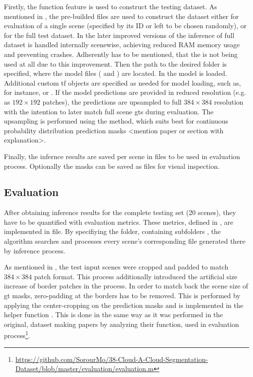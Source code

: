 {Firstly, the  function feature is used to construct the testing dataset.
As mentioned in ,
the pre-builded  files are used to construct the dataset either for evaluation of a single scene (specified by its ID or left to be chosen randomly),
or for the full test dataset. In the later improved versions of  the inference of full dataset is handled internally scenewise,
achieving reduced RAM memory usage and preventing crashes. Adherently has to be mentioned, that the  is not being used at all due to this improvement.
Then the path to the desired  folder is specified, where the model files ( and ) are located.
In  the  model is loaded. Additional custom \gls{tf} objects are specified as needed for model loading,
such as, for instance,  or .
If the model predictions are provided in reduced resolution (e.g. as \ensuremath{192\times192} patches),
the predictions are upsampled to full \ensuremath{384\times384} resolution with the intention to later match full scene \glspl{gt} during evaluation.
The upsampling is performed using the  method,
which suits best for continuous probability distribution prediction masks <mention paper or section with explanation>.

Finally, the infernce results are saved per scene in  files to be used in evaluation process.
Optionally the masks can be saved as  files for visual inspection.

\subsection*{Evaluation}

After obtaining inference results for the complete testing set (20 scenes), they have to be quantified with evaluation metrics.
These metrics, defined in , are implemented in  file.
By specifiying the  folder, containing subfolders ,
the algorithm searches and processes every scene's corresponding  file generated there by inference process.

As mentioned in , the test input scenes were cropped and padded to match \ensuremath{384\times384} patch format.
This process additionally introduced the artificial size increase of border patches in the process. In order to match back the scene size of \gls{gt} masks,
zero-padding at the borders has to be removed.
This is performed by applying the center-cropping on the prediction masks and is implemented in the helper function .
This is done in the same way as it was performed in the original, dataset making papers \cite{CloudNet2019, CloudDet2018} by analyzing their 
function, used in evaluation process\footnote{\url{https://github.com/SorourMo/38-Cloud-A-Cloud-Segmentation-Dataset/blob/master/evaluation/evaluation.m}}.

}
